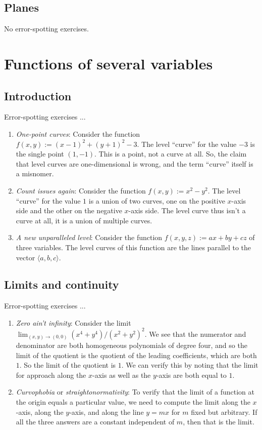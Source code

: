 \documentclass[10pt]{amsart}
\begin{document}
\subsection{Planes}

No error-spotting exercises.

\section{Functions of several variables}

\subsection{Introduction}

Error-spotting exercises ...

\begin{enumerate}
\item {\em One-point curves}: Consider the function $f(x,y) := (x -
  1)^2 + (y + 1)^2 - 3$. The level ``curve'' for the value $-3$ is the
  single point $(1,-1)$. This is a point, not a curve at all. So, the
  claim that level curves are one-dimensional is wrong, and the term
  ``curve'' itself is a misnomer.
\item {\em Count issues again}: Consider the function $f(x,y) := x^2 -
  y^2$. The level ``curve'' for the value $1$ is a union of two
  curves, one on the positive $x$-axis side and the other on the
  negative $x$-axis side. The level curve thus isn't a curve at all,
  it is a union of multiple curves.
\item {\em A new unparalleled level}: Consider the function $f(x,y,z) :=
  ax + by + cz$ of three variables. The level curves of this function
  are the lines parallel to the vector $\langle a,b,c \rangle$.
\end{enumerate}

\subsection{Limits and continuity}

Error-spotting exercises ...

\begin{enumerate}
\item {\em Zero ain't infinity}: Consider the limit $\lim_{(x,y) \to
  (0,0)} (x^4 + y^4)/(x^2 + y^2)^2$. We see that the numerator and
  denominator are both homogeneous polynomials of degree four, and so
  the limit of the quotient is the quotient of the leading
  coefficients, which are both $1$. So the limit of the quotient is
  $1$. We can verify this by noting that the limit for approach along
  the $x$-axis as well as the $y$-axis are both equal to $1$.
\item {\em Curvophobia} or {\em straightonormativity}: To verify that
  the limit of a function at the origin equals a particular value, we
  need to compute the limit along the $x$-axis, along the $y$-axis,
  and along the line $y = mx$ for $m$ fixed but arbitrary. If all the
  three answers are a constant independent of $m$, then that is the
  limit.
\end{enumerate}
\end{document}
